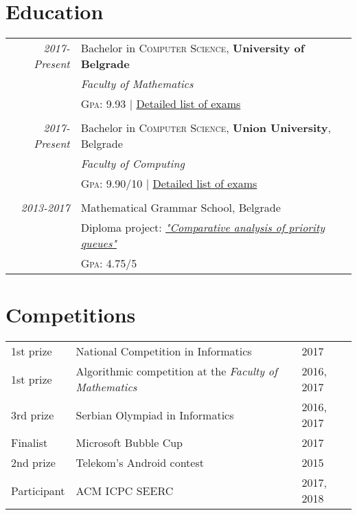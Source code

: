 \documentclass[a4paper,10pt]{article}
\begin{document}
\section{Education}
\begin{tabular}{rl}	
 \emph{2017-Present} & Bachelor in \textsc{Computer Science}, \textbf{University of Belgrade}\\
&\emph{Faculty of Mathematics} \\
&\normalsize \textsc{Gpa}: 9.93 {\hfill | \footnotesize \href{http://www.matf.bg.ac.rs/eng/m/94/osnovne-informatics/}{Detailed list of exams}}\\&\\

\emph{2017-Present} & Bachelor in \textsc{Computer Science}, \textbf{Union University}, Belgrade\\
&\emph{Faculty of Computing} \\
&\normalsize \textsc{Gpa}: 9.90/10 {\hfill | \footnotesize \href{https://raf.edu.rs/en/studies-eng/undergraduate-studies/computer-science/175-english/studies/computer-science-undergraduate-studies/3265-plan-and-content-of-study}{Detailed list of exams}}\\&\\

\emph{2013-2017} & Mathematical Grammar School, Belgrade\\
&Diploma project: \href{https://www.mg.edu.rs/images/stories/dokumenta/maturski/kosta-grujcic-2017.pdf}{\emph{"Comparative analysis of priority queues"}}\\
&\normalsize \textsc{Gpa}: 4.75/5\\

\end{tabular}

\section{Competitions}
\begin{tabular}{l l l}
 1st prize & National Competition in Informatics & 2017\\
 1st prize & Algorithmic competition at the \emph{Faculty of Mathematics} & 2016, 2017\\
 3rd prize & Serbian Olympiad in Informatics & 2016, 2017\\
 Finalist & Microsoft Bubble Cup & 2017\\
 2nd prize & Telekom's Android contest & 2015\\
 Participant & ACM ICPC SEERC & 2017, 2018\\
 
\end{tabular}
\end{document}
